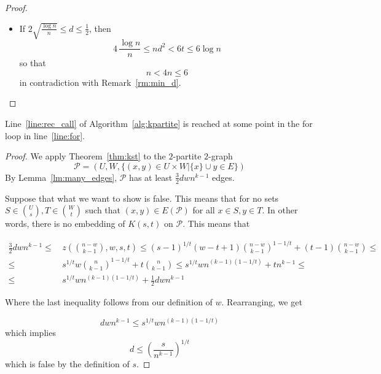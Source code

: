 \begin{lemma}
\begin{proof}
\begin{itemize}
            \item If $2 \sqrt{\frac{\log n}{n}} \leq d \leq \frac{1}{2}$, then
            \[
                4 \, \frac{\log n}{n} \leq nd^2 < 6t \leq 6 \log n
            \]
            so that
            \[
                n < 4 n \leq 6
            \]
            in contradiction with Remark~\ref{rm:min_d}. \qedhere
        \end{itemize}
    \end{proof}
\end{lemma}

\begin{lemma}\label{lm:return}
    Line~\ref{line:rec_call} of Algorithm~\ref{alg:kpartite} is reached at some point in the for
    loop in line~\ref{line:for}.
    \begin{proof}
        We apply Theorem~\ref{thm:kst} to the $2$-partite $2$-graph
        \[
            \mathcal{P} = (U, W, \{(x, y) \in U \times W | \{x\} \cup y \in E \})
        \]
        By Lemma~\ref{lm:many_edges}, $\mathcal{P}$ has at least
        $\frac{3}{2}dwn^{k-1}$ edges.

        Suppose that what we want to show is false.
        This means that for no sets $S \in \binom{U}{s}, T \in \binom{W}{t}$
        such that $(x, y) \in E (\mathcal{P})$ for all $x \in S, y \in T $.
        In other words, there is no embedding of $K(s, t)$ on $\mathcal{P}$.
        This means that


        \begin{align*}
            \frac{3}{2}dwn^{k-1} \leq &
            \, z \left(\binom{n - w}{k-1}, w, s, t  \right) \leq
            (s-1)^{1/t}(w-t+1)\binom{n-w}{k-1}^{1-1/t} + (t-1)\binom{n-w}{k-1} \leq \\
            \leq & \, s^{1/t} w \binom{n}{k-1}^{1-1/t} + t \binom{n}{k-1} \leq
             s^{1/t} wn^{(k-1)(1-1/t)} + tn^{k-1} \leq \\
            \leq & \, s^{1/t} wn^{(k-1)(1-1/t)} + \frac{1}{2} dwn^{k-1}
        \end{align*}

        Where the last inequality follows from our definition of $w$.
        Rearranging, we get

        \[
            dwn^{k-1} \leq s^{1/t} wn^{(k-1)(1-1/t)}
        \]
        which implies
        \[
            d \leq \left(\frac{s}{n^{k-1}}\right)^{1/t}
        \]
        which is false by the definition of $s$.
    \end{proof}
\end{lemma}

